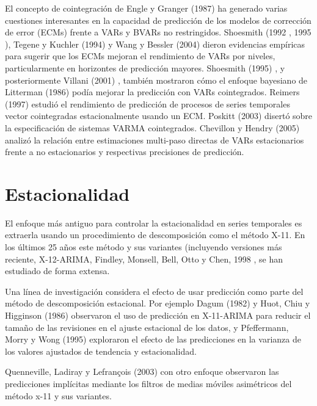 \documentclass{llncs}
\begin{document}
El concepto de cointegración de Engle y Granger (1987) \cite{Engle1987251} ha generado varias cuestiones interesantes en la capacidad de predicción de los modelos de corrección de error (ECMs) frente a VARs y BVARs no restringidos. Shoesmith (1992 \cite{Shoesmith1992187}, 1995 \cite{Shoesmith1995557}), Tegene y Kuchler (1994) \cite{Tegene199465} y Wang y Bessler (2004) \cite{Wang2004683} dieron evidencias empíricas para sugerir que los ECMs mejoran el rendimiento de VARs por niveles, particularmente en horizontes de predicción mayores. Shoesmith (1995) \cite{Shoesmith1995557}, y posteriormente Villani (2001) \cite{Villani2001585}, también mostraron cómo el enfoque bayesiano de Litterman (1986) \cite{Litterman198625} podía mejorar la predicción con VARs cointegrados. Reimers (1997) \cite{Reimers1997369} estudió el rendimiento de predicción de procesos de series temporales vector cointegradas estacionalmente usando un ECM. Poskitt (2003) \cite{Poskitt2003503} disertó sobre la especificación de sistemas VARMA cointegrados. Chevillon y Hendry (2005) \cite{Chevillon2005201} analizó la relación entre estimaciones multi-paso directas de VARs estacionarios frente a no estacionarios y respectivas precisiones de predicción. 

\section{Estacionalidad}
El enfoque más antiguo para controlar la estacionalidad en series temporales es extraerla usando un procedimiento de descomposición como el método X-11. En los últimos 25 años este método y sus variantes (incluyendo versiones más reciente, X-12-ARIMA, Findley, Monsell, Bell, Otto y Chen, 1998 \cite{Findley1998127}, se han estudiado de forma extensa.

Una línea de investigación considera el efecto de usar predicción como parte del método de descomposición estacional. Por ejemplo Dagum (1982) \cite{Dagum1982173} y Huot, Chiu y Higginson (1986) \cite{Huot1986217} observaron el uso de predicción en X-11-ARIMA para reducir el tamaño de las revisiones en el ajuste estacional de los datos, y Pfeffermann, Morry y Wong (1995) \cite{Pfeffermann1995271} exploraron el efecto de las predicciones en la  varianza de los valores ajustados de tendencia y estacionalidad.

Quenneville, Ladiray y Lefrançois (2003) \cite{Quenneville2003727} con otro enfoque observaron las predicciones implícitas mediante los filtros de medias móviles asimétricos del método x-11 y sus variantes.
\end{document}
